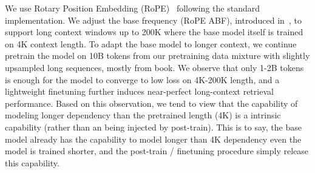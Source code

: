 We use Rotary Position Embedding 
 (RoPE)~\citep{su2021roformer} following the standard implementation.
We adjust the base frequency (RoPE ABF), introduced in~\citet{xiong2023effective}, to support long context windows up to 200K where the base model itself is trained on 4K context length. 
To adapt the base model to longer context, we continue pretrain the model on 10B tokens from our pretraining data mixture with slightly upsampled long sequences, mostly from book. 
We observe that only 1-2B tokens is enough for the model to converge to low loss on 4K-200K length, and a lightweight finetuning further induces near-perfect long-context retrieval performance. 
Based on this observation, we tend to view that the capability of modeling longer dependency than the pretrained length (4K) is a intrinsic capability (rather than an being injected by post-train).
This is to say, the base model already has the capability to model longer than 4K dependency even the model is trained shorter, and the post-train / finetuning procedure simply release this capability.




